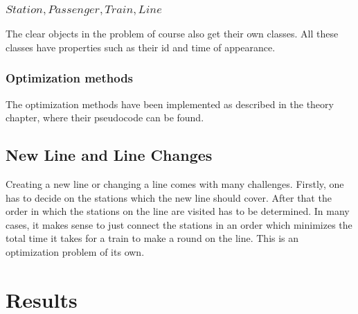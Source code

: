 \documentclass[10pt]{report}
\begin{document}
\subsection{$Station, Passenger, Train, Line$}
The clear objects in the problem of course also get their own classes. All these classes have properties such as their id and time of appearance. 

\subsection{Optimization methods}
The optimization methods have been implemented as described in the theory chapter, where their pseudocode can be found.

\section{New Line and Line Changes}
Creating a new line or changing a line comes with many challenges. Firstly, one has to decide on the stations which the new line should cover. After that the order in which the stations on the line are visited has to be determined. In many cases, it makes sense to just connect the stations in an order which minimizes the total time it takes for a train to make a round on the line. This is an optimization problem of its own.

\chapter{Results}

\printbibliography
\end{document}
